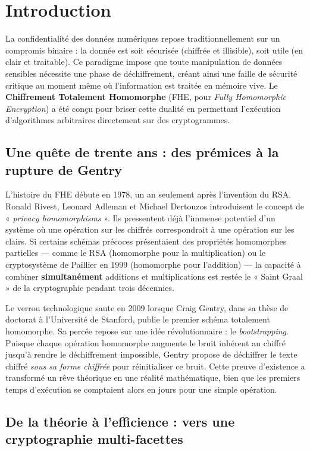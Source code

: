 \section*{Introduction}

La confidentialité des données numériques repose traditionnellement sur un compromis binaire : la donnée est soit sécurisée (chiffrée et illisible), soit utile (en clair et traitable). Ce paradigme impose que toute manipulation de données sensibles nécessite une phase de déchiffrement, créant ainsi une faille de sécurité critique au moment même où l'information est traitée en mémoire vive. Le \textbf{Chiffrement Totalement Homomorphe} (FHE, pour \textit{Fully Homomorphic Encryption}) a été conçu pour briser cette dualité en permettant l'exécution d'algorithmes arbitraires directement sur des cryptogrammes.

\subsection*{Une quête de trente ans : des prémices à la rupture de Gentry}

L'histoire du FHE débute en 1978, un an seulement après l'invention du RSA. Ronald Rivest, Leonard Adleman et Michael Dertouzos introduisent le concept de « \textit{privacy homomorphisms} ». Ils pressentent déjà l'immense potentiel d'un système où une opération sur les chiffrés correspondrait à une opération sur les clairs. Si certains schémas précoces présentaient des propriétés homomorphes partielles — comme le RSA (homomorphe pour la multiplication) ou le cryptosystème de Paillier en 1999 (homomorphe pour l'addition) — la capacité à combiner \textbf{simultanément} additions et multiplications est restée le « Saint Graal » de la cryptographie pendant trois décennies.

Le verrou technologique saute en 2009 lorsque Craig Gentry, dans sa thèse de doctorat à l'Université de Stanford, publie le premier schéma totalement homomorphe. Sa percée repose sur une idée révolutionnaire : le \textit{bootstrapping}. Puisque chaque opération homomorphe augmente le bruit inhérent au chiffré jusqu'à rendre le déchiffrement impossible, Gentry propose de déchiffrer le texte chiffré \textit{sous sa forme chiffrée} pour réinitialiser ce bruit. Cette preuve d'existence a transformé un rêve théorique en une réalité mathématique, bien que les premiers temps d'exécution se comptaient alors en jours pour une simple opération.

\subsection*{De la théorie à l'efficience : vers une cryptographie multi-facettes}

